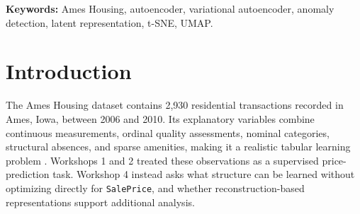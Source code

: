 \documentclass[11pt,letterpaper]{article}
\begin{document}
\begin{abstract}
This study investigates unsupervised representation learning on the Ames Housing dataset using a standard autoencoder (AE) and a variational autoencoder (VAE). A leakage-aware preprocessing pipeline fitted exclusively on 2,050 training observations produced 262 standardized inputs, while model selection used 440 validation observations and the fixed 440-property test set remained untouched until final evaluation. Among AE bottlenecks of 32, 64, and 128 dimensions, the 128-dimensional model achieved the lowest validation reconstruction mean squared error (MSE), 0.452771. For the 64-dimensional VAE, $\beta=0.5$ outperformed $\beta=1$ and $\beta=4$ in reconstruction and retained more active latent units, whereas the larger values showed posterior collapse. On test, the selected AE obtained MSE 0.399277, mean absolute error (MAE) 0.359611, and Pearson correlation 0.762230; the VAE obtained 0.940321, 0.419778, and 0.091476, respectively. Reconstruction scores offered only modest discrimination of abnormal sale conditions: the best AE score reached ROC-AUC 0.6317 and F1 0.1875 on 19 positive transactions. Latent-space analysis showed that the supervised Workshop 2 multilayer perceptron (MLP) had the clearest price gradient, while AE representations preserved local neighborhoods more faithfully than the VAE projections. These results support the AE as the stronger reconstruction model, but also show that reconstruction fidelity, anomaly ranking, and descriptive latent geometry are distinct evaluation objectives.
\end{abstract}

\noindent\textbf{Keywords:} Ames Housing, autoencoder, variational autoencoder, anomaly detection, latent representation, t-SNE, UMAP.

\section{Introduction}
The Ames Housing dataset contains 2,930 residential transactions recorded in Ames, Iowa, between 2006 and 2010. Its explanatory variables combine continuous measurements, ordinal quality assessments, nominal categories, structural absences, and sparse amenities, making it a realistic tabular learning problem \cite{decock2011}. Workshops 1 and 2 treated these observations as a supervised price-prediction task. Workshop 4 instead asks what structure can be learned without optimizing directly for \texttt{SalePrice}, and whether reconstruction-based representations support additional analysis.
\end{document}
